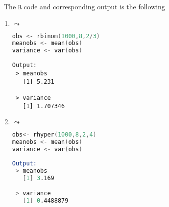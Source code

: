 \documentclass[11pt]{article}
\newenvironment{SL}[1][Solution]{\begin{trivlist}
\item[{\color{blue} \hskip \labelsep {\bfseries #1:}}]}{\end{trivlist}}
\begin{document}
\begin{SL}\
The $\texttt{R}$ code and corresponding output is the following
\begin{enumerate}
\item $\leadsto$
\begin{lstlisting}[language=S]
obs <- rbinom(1000,8,2/3) 
meanobs <- mean(obs) 
variance <- var(obs)
\end{lstlisting}

\begin{lstlisting}[]
Output:
 > meanobs
   [1] 5.231

 > variance
   [1] 1.707346
\end{lstlisting}
\item $\leadsto$
\begin{lstlisting}[language=S]
obs<- rhyper(1000,8,2,4) 
meanobs <- mean(obs) 
variance <- var(obs)
\end{lstlisting}

\begin{lstlisting}[language=S]
Output:
 > meanobs
   [1] 3.169

 > variance
   [1] 0.4488879
\end{lstlisting}
\end{enumerate}
\end{SL}

\end{document}
